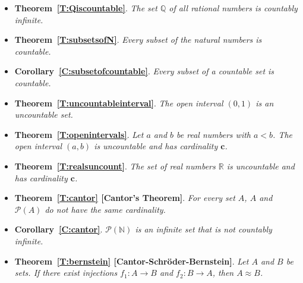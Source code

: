 \begin{itemize}
\item \textbf{Theorem~\ref{T:Qiscountable}}.  
\emph{The set $\mathbb{Q}$ of all rational numbers is countably infinite.}


\item \textbf{Theorem~\ref{T:subsetsofN}}.  
\emph{Every subset of the natural numbers is countable.}


\item \textbf{Corollary~\ref{C:subsetofcountable}}.  
\emph{Every subset of a countable set is countable.}


\item \textbf{Theorem~\ref{T:uncountableinterval}}.
\emph{The open interval $( 0, 1 )$ is an uncountable set.}


\item \textbf{Theorem~\ref{T:openintervals}}.
\emph{Let $a$ and $b$ be real numbers with $a < b$.  The open interval $( a, b )$ is uncountable and has cardinality $\boldsymbol{c}$.}


\item \textbf{Theorem~\ref{T:realsuncount}}.
\emph{The set of real numbers $\mathbb{R}$ is uncountable and has cardinality $\boldsymbol{c}$.}


\item \textbf{Theorem~\ref{T:cantor} [Cantor's Theorem]}.
\emph{For every set $A$, $A$ and $\mathcal{P} ( A )$ do not have the same cardinality.}


\item \textbf{Corollary~\ref{C:cantor}}.
\emph{$\mathcal{P} ( \mathbb{N} )$ is an infinite set that is not countably infinite.}


\item \textbf{Theorem~\ref{T:bernstein} [Cantor-Schr\"{o}der-Bernstein]}.
\emph{Let $A$ and $B$ be sets.  If there exist injections $f_1:A \to B$ and $f_2:B \to A$, then $A \approx B$.}





\end{itemize}

\hbreak

\endinput
